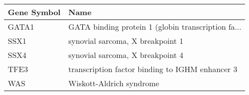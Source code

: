 \begin{tabular}{ll}
\toprule
Gene Symbol &                                               Name \\
\midrule
      GATA1 & GATA binding protein 1 (globin transcription fa... \\
       SSX1 &                   synovial sarcoma, X breakpoint 1 \\
       SSX4 &                   synovial sarcoma, X breakpoint 4 \\
       TFE3 &    transcription factor binding to IGHM enhancer 3 \\
        WAS &                           Wiskott-Aldrich syndrome \\
\bottomrule
\end{tabular}

